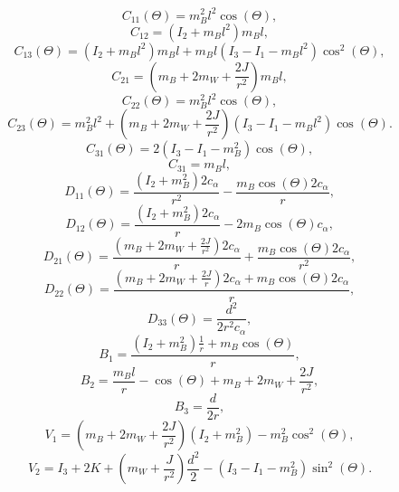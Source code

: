 \begin{itemize}
	\begin{equation}
		C_{11}(\Theta) = m_B^2 l^2 \cos(\Theta),
	\end{equation}
	\begin{equation}
		C_{12} = (I_2 + m_B l^2) m_B l,
	\end{equation}
	\begin{equation}
		C_{13}(\Theta) = (I_2 + m_B l^2) m_B l + m_B l (I_3 - I_1 - m_B l^2) \cos^2(\Theta),
	\end{equation}
	\begin{equation}
		C_{21} = (m_B + 2m_W + \frac{2J}{r^2}) m_B l,
	\end{equation}
	\begin{equation}
		C_{22}(\Theta) = m_B^2 l^2 \cos(\Theta),
	\end{equation}
	\begin{equation}
		C_{23}(\Theta) = m_B^2 l^2 + (m_B + 2m_W + \frac{2J}{r^2}) (I_3 - I_1 - m_B l^2) \cos(\Theta).
	\end{equation}
	\begin{equation}
		C_{31}(\Theta) = 2 (I_3 - I_1 - m_B^2) \cos(\Theta),
	\end{equation}
	\begin{equation}
		C_{31} = m_B l,
	\end{equation}
	\begin{equation}
		D_{11}(\Theta) = \frac{(I_2 + m_B^2) 2c_\alpha}{r^2} - \frac{m_B \cos(\Theta) 2c_\alpha}{r},
	\end{equation}
	\begin{equation}
		D_{12}(\Theta) = \frac{(I_2 + m_B^2) 2c_\alpha}{r} - 2m_B \cos(\Theta) c_\alpha,
	\end{equation}
	\begin{equation}
		D_{21}(\Theta) = \frac{(m_B + 2m_W + \frac{2J}{r^2}) 2c_\alpha}{r} + \frac{m_B \cos(\Theta) 2c_\alpha}{r^2},
	\end{equation}
	\begin{equation}
		D_{22}(\Theta) = \frac{(m_B + 2m_W + \frac{2J}{r}) 2c_\alpha + m_B \cos(\Theta) 2c_\alpha}{r},
	\end{equation}
	\begin{equation}
		D_{33}(\Theta) = \frac{d^2}{2r^2 c_\alpha},
	\end{equation}
	\begin{equation}
		B_{1} = \frac{(I_2 + m_B^2) \frac{1}{r} + m_B \cos(\Theta)}{r},
	\end{equation}
	\begin{equation}
		B_{2} = \frac{m_B l}{r} - \cos(\Theta) + m_B + 2m_W + \frac{2J}{r^2},
	\end{equation}
	\begin{equation}
		B_{3} = \frac{d}{2r},
	\end{equation}
	\begin{equation}
		V_{1} = (m_B + 2m_W + \frac{2J}{r^2}) (I_2 + m_B^2) - m_B^2 \cos^2(\Theta),
	\end{equation}
	\begin{equation}
		V_{2} = I_3 + 2K + (m_W + \frac{J}{r^2}) \frac{d^2}{2} - (I_3 - I_1 - m_B^2) \sin^2(\Theta).
	\end{equation}
	

\end{itemize}
